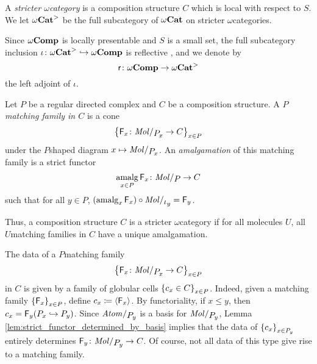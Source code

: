 \begin{dfn} \label{dfn:stricter_omega_cat}
    A \emph{stricter \( \omega \)\nbd category} is a composition structure \( C \) which is local with respect to \( S \).
    We let \( {\omega\mathbf{Cat}}^> \) be the full subcategory of \( {\omega\mathbf{Cat}} \) on stricter \( \omega \)\nbd categories.
\end{dfn}

\noindent Since \( \omega\mathbf{Comp} \) is locally presentable and \( S \) is a small set, the full subcategory inclusion \( \iota \colon {\omega\mathbf{Cat}}^> \hookrightarrow \omega\mathbf{Comp} \) is reflective \cite{freyd1972continuous}, and we denote by 
\begin{equation*}
    \mathsf{r} \colon \omega\mathbf{Comp} \to {\omega\mathbf{Cat}}^>
\end{equation*}
the left adjoint of \( \iota \).

\begin{dfn} 
    Let \( P \) be a regular directed complex and \( C \) be a composition structure.
    A \emph{\( P \)\nbd matching family in \( C \)} is a cone 
    \begin{equation*}
        \set{\F_x \colon \molecin{\imel{P}{x}} \to C}_{x \in P}
    \end{equation*}
    under the \( P \)\nbd shaped diagram \( x \mapsto \molecin{\imel{P}{x}} \).    
    An \emph{amalgamation} of this matching family is a strict functor 
    \begin{equation*}
        \amalg_{x\in P} \F_x \colon \molecin{P} \to C
    \end{equation*}
    such that for all \( y \in P \), \( (\amalg_x \F_x) \after \molecin{\mapel{y}} = \F_y \).
\end{dfn}

\begin{rmk}
    Thus, a composition structure \( C \) is a stricter \( \omega \)\nbd category if for all molecules \( U \), all \( U \)\nbd matching families in \( C \) have a unique amalgamation.
\end{rmk}

\begin{rmk}\label{rmk:data_matching family}
    The data of a \( P \)\nbd matching family 
    \begin{equation*}
        \set{\F_x \colon \molecin{\imel{P}{x}} \to C}_{x \in P}
    \end{equation*}
    in \( C \) is given by a family of globular cells \( \left\{ {c_x \in C} \right\}_{x \in P} \).
    Indeed, given a matching family \( \left\{ {\mathsf{F}_x} \right\}_{x \in P} \), define \( c_x \coloneqq \langle\mathsf{F}_x\rangle \).
    By functoriality, if \( x \le y \), then \( c_x = \mathsf{F}_y({P}_{x} \hookrightarrow {P}_{y}) \).
    Since \( \atomin{\imel{P}{y}} \) is a basis for \( \molecin{\imel{P}{y}} \), Lemma \ref{lem:strict_functor_determined_by_basis} implies that the data of \( \left\{ {c_x} \right\}_{x \in {P}_{y}} \) entirely determines \( \F_y \colon \molecin{\imel{P}{y}} \to C \).
    Of course, not all data of this type give rise to a matching family. 
\end{rmk}

